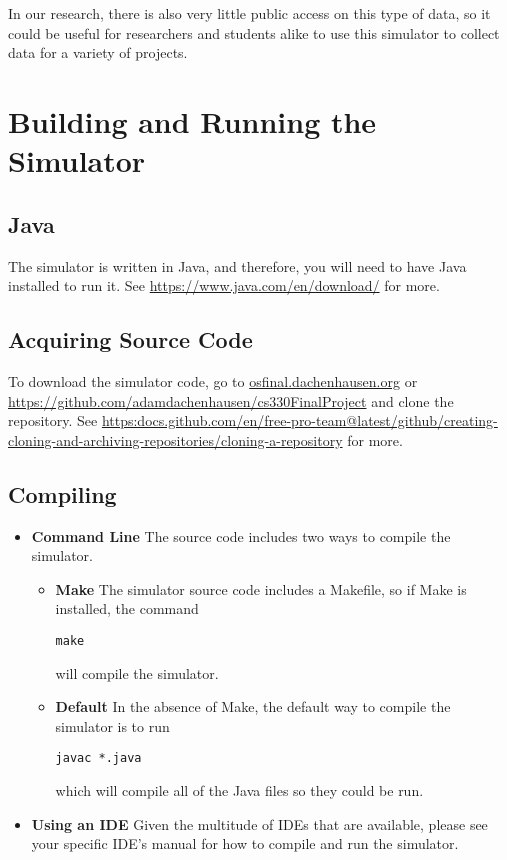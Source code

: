 \documentclass[12pt]{article}
\begin{document}
In our research, there is also very little public access on this type of data, so
it could be useful for researchers and students alike to use this simulator to collect
data for a variety of projects.

\section{Building and Running the Simulator}
\label{sec:build}

\subsection{Java}
The simulator is written in Java, and therefore, you will need to have
Java installed to run it. See \url{https://www.java.com/en/download/}
 for more.

\subsection{Acquiring Source Code}
To download the simulator code, go to \url{osfinal.dachenhausen.org}
or \url{https://github.com/adamdachenhausen/cs330FinalProject} and clone the repository.
See
\url{https:docs.github.com/en/free-pro-team@latest/github/creating-cloning-and-archiving-repositories/cloning-a-repository}
for more.

\subsection{Compiling}
\begin{itemize}

\item \textbf{Command Line}
  The source code includes two ways to compile the simulator.
  \begin{itemize}
  \item \textbf{Make}
  The simulator source code includes a Makefile, so if Make is installed, the command
  \begin{verbatim}make\end{verbatim}
  will compile the simulator.
  \item \textbf{Default}
  In the absence of Make, the default way to compile the simulator is to run  
  \begin{verbatim}javac *.java\end{verbatim}
  which will compile all of the Java files so they could be run.
  \end{itemize}
\item \textbf{Using an IDE}
  Given the multitude of IDEs that are available, please see your
  specific IDE's manual for how to compile and run the simulator.
  
\end{itemize}
\end{document}
